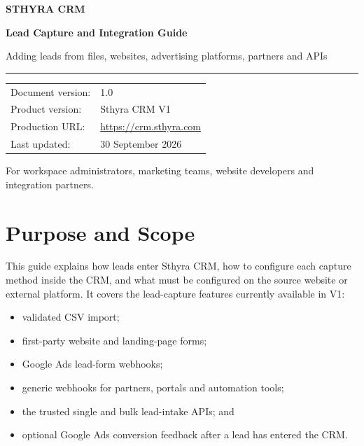 \documentclass[11pt,a4paper]{article}
\newcommand{\product}{Sthyra CRM}
\begin{document}
\begin{titlepage}
  \color{Ink}
  \vspace*{22mm}
  {\Large\bfseries\textcolor{SthyraGreen}{STHYRA CRM}\par}
  \vspace{18mm}
  {\Huge\bfseries Lead Capture and Integration Guide\par}
  \vspace{5mm}
  {\Large Adding leads from files, websites, advertising platforms, partners and APIs\par}
  \vspace{16mm}
  \textcolor{Rule}{\rule{\textwidth}{1pt}}
  \vspace{8mm}

  \begin{tabular}{@{}ll@{}}
    Document version: & 1.0 \\
    Product version: & Sthyra CRM V1 \\
    Production URL: & \url{https://crm.sthyra.com} \\
    Last updated: & 30 September 2026 \\
  \end{tabular}

  \vfill
  {\small\textcolor{Muted}{For workspace administrators, marketing teams, website developers and integration partners.}\par}
\end{titlepage}

\tableofcontents
\newpage

\section{Purpose and Scope}

This guide explains how leads enter \product, how to configure each capture method inside the CRM, and what must be configured on the source website or external platform. It covers the lead-capture features currently available in V1:

\begin{itemize}
  \item validated CSV import;
  \item first-party website and landing-page forms;
  \item Google Ads lead-form webhooks;
  \item generic webhooks for partners, portals and automation tools;
  \item the trusted single and bulk lead-intake APIs; and
  \item optional Google Ads conversion feedback after a lead has entered the CRM.
\end{itemize}
\end{document}
